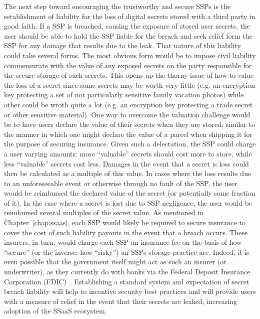 The next step toward encouraging the trustworthy and secure SSPs is
the establishment of liability for the loss of digital secrets stored
with a third party in good faith. If a SSP is breached, causing the
exposure of stored user secrets, the user should be able to hold the
SSP liable for the breach and seek relief form the SSP for any damage
that results due to the leak. That nature of this liability could take
several forms. The most obvious form would be to impose civil
liability commensurate with the value of any exposed secrets on the
party responsible for the secure storage of such secrets. This opens
up the thorny issue of how to value the loss of a secret since some
secrets may be worth very little (e.g. an encryption key protecting a
set of not particularly sensitive family vacation photos) while other
could be wroth quite a lot (e.g. an encryption key protecting a trade
secret or other sensitive material). One way to overcome the valuation
challenge would be to have users declare the value of their secrets
when they are stored, similar to the manner in which one might declare
the value of a parcel when shipping it for the purpose of securing
insurance. Given such a delectation, the SSP could charge a user
varying amounts: more ``valuable'' secrets should cost more to store,
while less ``valuable'' secrets cost less. Damages in the event that a
secret is loss could then be calculated as a multiple of this
value. In cases where the loss results due to an unforeseeable event
or otherwise through no fault of the SSP, the user would be reimbursed
the declared value of the secret (or potentially some fraction of
it). In the case where a secret is lost due to SSP negligence, the
user would be reimbursed several multiples of the secret value. As
mentioned in Chapter~\ref{chap:ssaas}, each SSP would likely be
required to secure insurance to cover the cost of such liability
payouts in the event that a breach occurs. These insurers, in turn,
would charge each SSP an insurance fee on the basis of how ``secure''
(or the inverse: how ``risky'') an SSPs storage practice are. Indeed,
it is even possible that the government itself might act as such an
insurer (or underwriter), as they currently do with banks via the
Federal Deposit Insurance Corporation (FDIC)~\cite{fdic}. Establishing
a standard system and expectation of secret breach liability will help
to incentive security best practices and will provide users with a
measure of relief in the event that their secrets are leaked,
increasing adoption of the SSaaS ecosystem.

